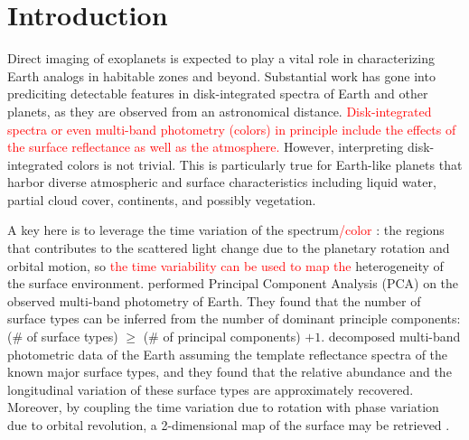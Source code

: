 \documentclass[iop,numberedappendix,apj]{emulateapj}
\def\edit#1{\textcolor{red}{#1}}
\begin{document}
  



\section{Introduction}
\label{sec:intro}

Direct imaging of exoplanets is expected to play a vital role in characterizing Earth analogs in habitable zones and beyond. 
Substantial work has gone into prediciting detectable features in disk-integrated spectra of Earth and other planets, as they are observed from an astronomical distance. 
\edit{Disk-integrated spectra or even multi-band photometry (colors) in principle include the effects of the surface reflectance as well as the atmosphere. }
However, interpreting disk-integrated colors is not trivial. 
This is particularly true for Earth-like planets that harbor diverse atmospheric and surface characteristics including liquid water, partial cloud cover, continents, and possibly vegetation. 

A key here is to leverage the time variation of the spectrum\edit{/color}  \citep{Ford2001}: the regions that contributes to the scattered light change due to the planetary rotation and  orbital motion, so \edit{the time variability can be used to map the} heterogeneity of the surface environment.  
\citet{Cowan2009, Cowan2011} performed Principal Component Analysis (PCA) on the observed multi-band photometry of Earth. They found that the number of surface types can be inferred from the number of dominant principle components: (\# of surface types) $\ge $ (\# of principal components) $+ 1$. %
\citet{Fujii2010, Fujii2011} decomposed multi-band photometric data of the Earth assuming the template reflectance spectra of the known major surface types, and they found that the relative abundance and the longitudinal variation of these surface types are approximately recovered. 
Moreover, by coupling the time variation due to rotation with phase variation due to orbital revolution, a 2-dimensional map of the surface may be retrieved \citep{Kawahara2010, Kawahara2011, Fujii2012}. 
\end{document}
